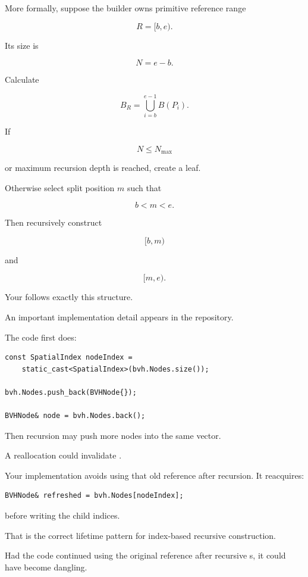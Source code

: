 More formally, suppose the builder owns primitive reference range

\[
R=[b,e).
\]

Its size is

\[
N=e-b.
\]

Calculate

\[
B_R=\bigcup_{i=b}^{e-1}B(P_i).
\]

If

\[
N\le N_{\max}
\]

or maximum recursion depth is reached, create a leaf.

Otherwise select split position \(m\) such that

\[
b<m<e.
\]

Then recursively construct

\[
[b,m)
\]

and

\[
[m,e).
\]

Your  follows exactly this structure.

An important implementation detail appears in the repository.

The code first does:

\begin{verbatim}
const SpatialIndex nodeIndex =
    static_cast<SpatialIndex>(bvh.Nodes.size());

bvh.Nodes.push_back(BVHNode{});

BVHNode& node = bvh.Nodes.back();
\end{verbatim}

Then recursion may push more nodes into the same vector.

A  reallocation could invalidate .

Your implementation avoids using that old reference after recursion. It reacquires:

\begin{verbatim}
BVHNode& refreshed = bvh.Nodes[nodeIndex];
\end{verbatim}

before writing the child indices.

That is the correct lifetime pattern for index-based recursive construction.

Had the code continued using the original  reference after recursive s, it could have become dangling.

